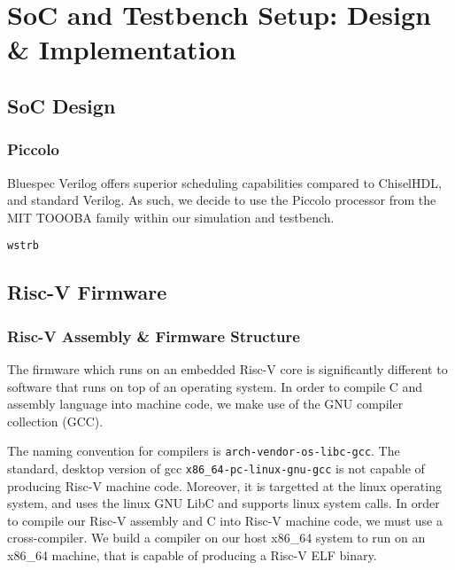 \documentclass[a4paper,8pt]{report}
\begin{document}


% 



\chapter{SoC and Testbench Setup: Design \& Implementation}
\section{SoC Design}
\subsection{Piccolo}
Bluespec Verilog offers superior scheduling capabilities compared to ChiselHDL,
and standard Verilog. As such, we decide to use the Piccolo processor from the
MIT TOOOBA family within our simulation and testbench. 


\texttt{wstrb}

\section{Risc-V Firmware}
\subsection{Risc-V Assembly \& Firmware Structure}
The firmware which runs on an embedded Risc-V core is significantly different to
software that runs on top of an operating system. In order to compile C and
assembly language into machine code, we make use of the GNU compiler collection
(GCC).

The naming convention for compilers is \texttt{arch-vendor-os-libc-gcc}. The
standard, desktop version of gcc \texttt{x86\_64-pc-linux-gnu-gcc} is not
capable of producing Risc-V machine code. Moreover, it is targetted at the linux
operating system, and uses the linux GNU LibC and supports linux system calls.
In order to compile our Risc-V assembly and C into Risc-V machine code, we must
use a cross-compiler. We build a compiler on our host x86\_64 system to run on
an x86\_64 machine, that is capable of producing a Risc-V ELF binary.
\end{document}
